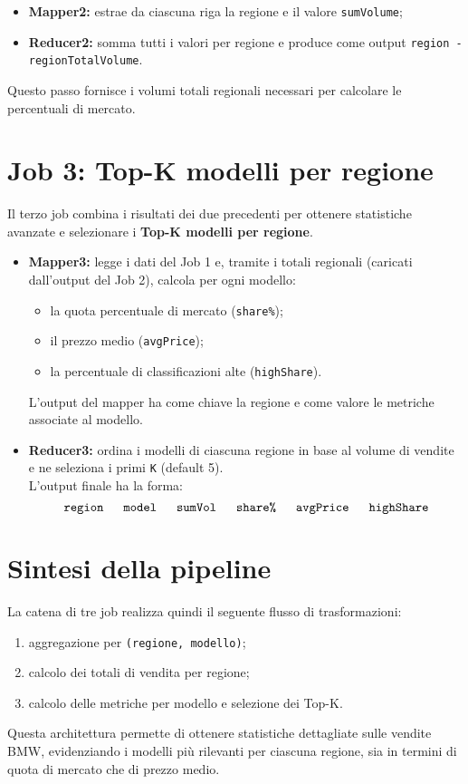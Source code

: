 		\begin{itemize}
			\item \textbf{Mapper2:} estrae da ciascuna riga la regione e il valore \texttt{sumVolume};
			\item \textbf{Reducer2:} somma tutti i valori per regione e produce come output \texttt{region - regionTotalVolume}.
		\end{itemize}
		
		Questo passo fornisce i volumi totali regionali necessari per calcolare le percentuali di mercato.
	
	\section{Job 3: Top-K modelli per regione}
		Il terzo job combina i risultati dei due precedenti per ottenere statistiche avanzate e selezionare i \textbf{Top-K modelli per regione}.
		
		\begin{itemize}
			\item \textbf{Mapper3:} legge i dati del Job 1 e, tramite i totali regionali (caricati dall’output del Job 2), calcola per ogni modello:
			\begin{itemize}
				\item la quota percentuale di mercato (\texttt{share\%});
				\item il prezzo medio (\texttt{avgPrice});
				\item la percentuale di classificazioni alte (\texttt{highShare}).
			\end{itemize}
			
			L’output del mapper ha come chiave la regione e come valore le metriche associate al modello.
			
			\item \textbf{Reducer3:} ordina i modelli di ciascuna regione in base al volume di vendite e ne seleziona i primi \texttt{K} (default 5). \\
			L’output finale ha la forma:
			\[
				\texttt{region \quad model \quad sumVol \quad share\% \quad avgPrice \quad highShare}
			\]
		\end{itemize}
	
	\section{Sintesi della pipeline}
		La catena di tre job realizza quindi il seguente flusso di trasformazioni:
		
		\begin{enumerate}
			\item aggregazione per \texttt{(regione, modello)};
			\item calcolo dei totali di vendita per regione;
			\item calcolo delle metriche per modello e selezione dei Top-K.
		\end{enumerate}
		
		Questa architettura permette di ottenere statistiche dettagliate sulle vendite BMW, evidenziando i modelli più rilevanti per ciascuna regione, sia in termini di quota di mercato che di prezzo medio.